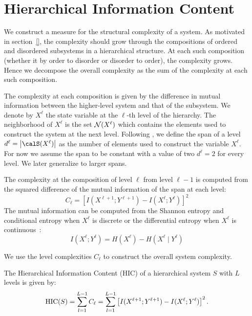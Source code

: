 \section{Hierarchical Information Content}
\label{sec:hic}

We construct a measure for the structural complexity of a system. As motivated
in section~\ref{}, the complexity should grow through the compositions of
ordered and disordered subsystems in a hierarchical structure. At each such
composition (whether it by order to disorder or disorder to order), the
complexity grows. Hence we decompose the overall complexity as the sum of the
complexity at each such composition.

The complexity at each composition is given by the difference in mutual
information between the higher-level system and that of the subsystem. We
denote by $X^{\ell}$ the state variable at the $\ell$-th level of the
hierarchy. The neighborhood of $X^\ell$ is the set $\mathcal{N}(X^\ell)$ which
contains the elements used to construct the system at the next level. Following
\citet{simon1991architecture}, we define the span of a level $d^\ell =
\left|\calS(X^\ell)\right|$ as the number of elements used to construct the variable $X^\ell$. For
now we assume the span to be constant with a value of two $d^\ell = 2$ for
every level. We later generalize to larger spans.

The complexity at the composition of level $\ell$ from level $\ell -1$ is
computed from the squared difference of the mutual information of the
span at each level:
\begin{equation}
  C_\ell = \left[ I(X^{\ell+1}; Y^{\ell+1}) - I(X^\ell; Y^\ell) \right]^2
\end{equation}
The mutual information can be computed from the Shannon entropy and conditional
entropy when $X^\ell$ is discrete or the differential entropy when $X^\ell$ is
continuous~\citep{cover1999elements}:
\begin{equation}
\label{eq:mutual_information}
I(X^\ell; Y^\ell) = H(X^\ell) - H(X^\ell \mid Y^\ell)
\end{equation}

We use the level complexities $C_\ell$ to construct the overall system complexity.
\begin{definition}
\label{def:hic}
  The Hierarchical Information Content (HIC) of a hierarchical system $S$ with
  $L$ levels is given by:
  \begin{equation}
    \label{eq:hic}
    \textup{HIC}(S) = \sum_{l=1}^{L-1} C_\ell = \sum_{l=1}^{L-1} \left[ I(X^{\ell+1}; Y^{\ell+1}) - I(X^\ell; Y^\ell) \right]^2.
  \end{equation}
\end{definition}

